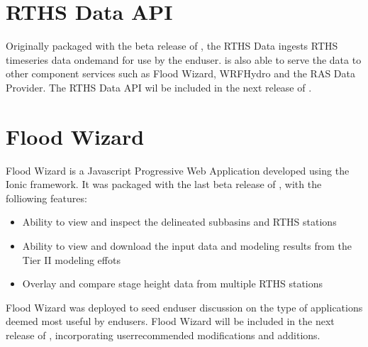 \documentclass[letterpaper,12pt,english,openany,oneside]{sphinxmanual}
\begin{document}
\section{RTHS Data API}
\label{\detokenize{euidev/integrations/index:rths-data-api}}
\sphinxAtStartPar
Originally packaged with the beta release of , the RTHS Data  ingests RTHS time\sphinxhyphen{}series data on\sphinxhyphen{}demand for use by the end\sphinxhyphen{}user.  is also able to serve the data to other component services such as Flood Wizard, WRF\sphinxhyphen{}Hydro and the RAS Data Provider. The  RTHS Data API wil be included in the next release of .


\section{Flood Wizard}
\label{\detokenize{euidev/integrations/index:flood-wizard}}
\sphinxAtStartPar
Flood Wizard is a Javascript Progressive Web Application developed using the Ionic framework. It was packaged with the last beta release of , with the folliowing features:
\begin{itemize}
\item {} 
\sphinxAtStartPar
Ability to view and inspect the  delineated sub\sphinxhyphen{}basins and RTHS stations

\item {} 
\sphinxAtStartPar
Ability to view and download the input data and modeling results from the Tier II modeling effots

\item {} 
\sphinxAtStartPar
Overlay and compare stage height data from multiple RTHS stations

\end{itemize}

\sphinxAtStartPar
Flood Wizard was deployed to seed end\sphinxhyphen{}user discussion on the type of applications deemed most useful by end\sphinxhyphen{}users. Flood Wizard will be  included in the next release of , incorporating user\sphinxhyphen{}recommended modifications and additions.
\end{document}

